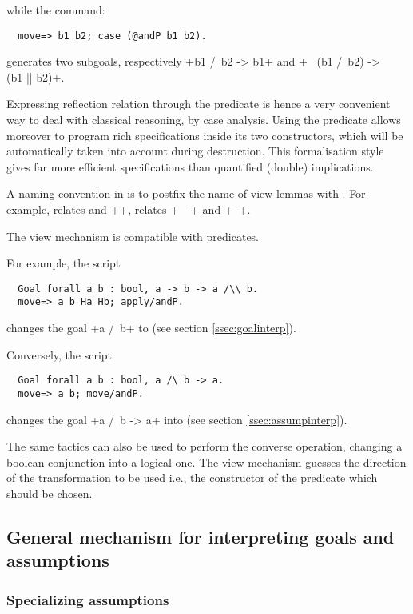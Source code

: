 while the command:
\begin{lstlisting}
  move=> b1 b2; case (@andP b1 b2).
\end{lstlisting}
generates two subgoals, respectively \ssrL+b1 /\ b2 -> b1+ and
\ssrL+~ (b1 /\ b2) -> ~~ (b1 || b2)+.



Expressing reflection relation through the  predicate
is hence a very convenient way to deal with classical reasoning, by
case analysis. Using the  predicate allows moreover to
program rich specifications inside
its two constructors, which will be automatically taken into account
during destruction. This formalisation style gives far more
efficient specifications than quantified (double) implications.


A naming convention in \ssr{} is to postfix the name of view lemmas with .
For example,  relates  \ssrC{||} and \ssrL+\/+,  relates
\ssrL+~~+ and \ssrL+~+.

The view mechanism is compatible with  predicates.

For example, the script
\begin{lstlisting}
  Goal forall a b : bool, a -> b -> a /\\ b.
  move=> a b Ha Hb; apply/andP.
\end{lstlisting}
changes the goal \ssrL+a /\ b+ to  (see section \ref{ssec:goalinterp}).

Conversely, the script
\begin{lstlisting}
  Goal forall a b : bool, a /\ b -> a.
  move=> a b; move/andP.
\end{lstlisting}
changes the goal \ssrL+a /\ b -> a+ into  (see section
\ref{ssec:assumpinterp}).


The same tactics can also be used to perform the converse
operation, changing a boolean conjunction into a logical one. The view
mechanism guesses the direction of the
transformation to be used i.e., the constructor of the 
predicate which should be chosen.

\subsection{General mechanism for interpreting goals and assumptions}


\subsubsection*{Specializing assumptions}

